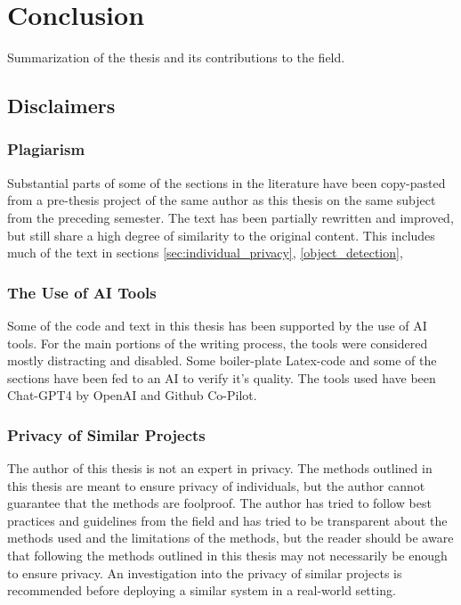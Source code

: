 \section{Conclusion}

Summarization of the thesis and its contributions to the field.


\subsection{Disclaimers}

\subsubsection{Plagiarism}
Substantial parts of some of the sections in the literature have been copy-pasted from a pre-thesis project of the same author as this thesis on the same subject from the preceding semester. The text has been partially rewritten and improved, but still share a high degree of similarity to the original content. This includes much of the text in sections \ref{sec:individual_privacy}, \ref{object_detection}, 

\subsubsection{The Use of AI Tools}
Some of the code and text in this thesis has been supported by the use of AI tools. For the main portions of the writing process, the tools were considered mostly distracting and disabled. Some boiler-plate Latex-code and some of the sections have been fed to an AI to verify it's quality. The tools used have been Chat-GPT4 by OpenAI and Github Co-Pilot.  

\subsubsection{Privacy of Similar Projects}
The author of this thesis is not an expert in privacy. The methods outlined in this thesis are meant to ensure privacy of individuals, but the author cannot guarantee that the methods are foolproof. The author has tried to follow best practices and guidelines from the field and has tried to be transparent about the methods used and the limitations of the methods, but the reader should be aware that following the methods outlined in this thesis may not necessarily be enough to ensure privacy. An investigation into the privacy of similar projects is recommended before deploying a similar system in a real-world setting.